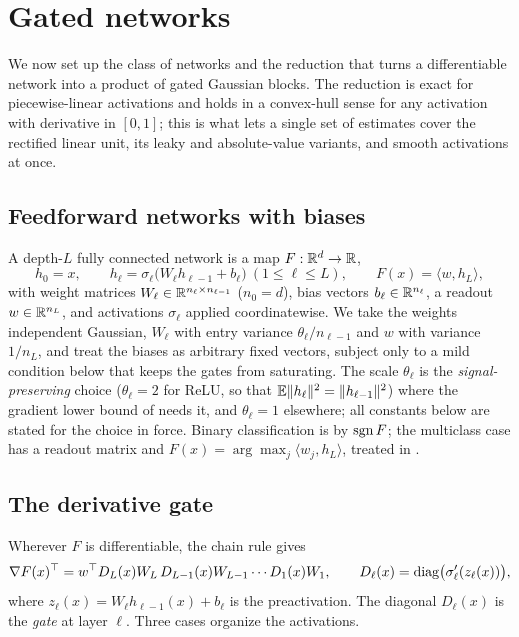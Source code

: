 \section{Gated networks}\label{sec:networks}

We now set up the class of networks and the reduction that turns a differentiable network into a
product of gated Gaussian blocks. The reduction is exact for piecewise-linear activations and holds
in a convex-hull sense for any activation with derivative in $[0,1]$; this is what lets a single set
of estimates cover the rectified linear unit, its leaky and absolute-value variants, and smooth
activations at once.

\subsection{Feedforward networks with biases}
A depth-$L$ fully connected network is a map $F:\mathbb{R}^{d}\to\mathbb{R}$,
\begin{equation}\label{eq:fcnet}
  h_0=x,\qquad h_\ell=\sigma_\ell\!\bigl(W_\ell h_{\ell-1}+b_\ell\bigr)\ (1\le\ell\le L),\qquad
  F(x)=\langle w, h_L\rangle,
\end{equation}
with weight matrices $W_\ell\in\mathbb{R}^{n_\ell\times n_{\ell-1}}$ ($n_0=d$), bias vectors
$b_\ell\in\mathbb{R}^{n_\ell}$, a readout $w\in\mathbb{R}^{n_L}$, and activations $\sigma_\ell$ applied
coordinatewise. We take the weights independent Gaussian, $W_\ell$ with entry variance
$\theta_\ell/n_{\ell-1}$ and $w$ with variance $1/n_L$, and treat the biases as arbitrary fixed vectors,
subject only to a mild condition below that keeps the gates from saturating. The scale $\theta_\ell$ is
the \emph{signal-preserving} choice ($\theta_\ell=2$ for ReLU, so that $\mathbb{E}\|h_\ell\|^2=\|h_{\ell-1}\|^2$)
where the gradient lower bound of  needs it, and $\theta_\ell=1$ elsewhere; all
constants below are stated for the choice in force. Binary classification is by $\operatorname{sgn} F$; the
multiclass case has a readout matrix and $F(x)=\arg\max_j\langle w_j,h_L\rangle$, treated in
.

\subsection{The derivative gate}
Wherever $F$ is differentiable, the chain rule gives
\begin{equation}\label{eq:jacobian}
  \nabla F(x)^\top=w^\top D_L(x)W_L\,D_{L-1}(x)W_{L-1}\cdots D_1(x)W_1,\qquad
  D_\ell(x)=\operatorname{diag}\bigl(\sigma_\ell'(z_\ell(x))\bigr),
\end{equation}
where $z_\ell(x)=W_\ell h_{\ell-1}(x)+b_\ell$ is the preactivation. The diagonal $D_\ell(x)$ is the
\emph{gate} at layer $\ell$. Three cases organize the activations.

